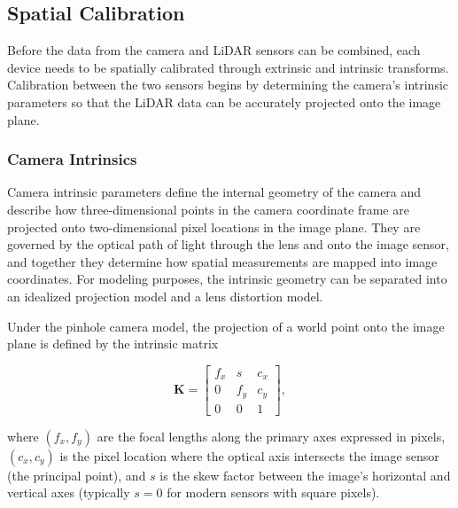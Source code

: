 \documentclass{erauthesis}
\begin{document}
\subsection{Spatial Calibration} \label{spatial_calibration}

Before the data from the camera and \ac{LiDAR} sensors can be combined, each device needs to be spatially calibrated through extrinsic and intrinsic transforms.
Calibration between the two sensors begins by determining the camera's intrinsic parameters so that the LiDAR data can be accurately projected onto the image plane.

\subsubsection{Camera Intrinsics} \label{camera_intrinsics}

Camera intrinsic parameters define the internal geometry of the camera and describe how three-dimensional points in the camera coordinate frame are projected onto two-dimensional pixel locations in the image plane.  
They are governed by the optical path of light through the lens and onto the image sensor, and together they determine how spatial measurements are mapped into image coordinates.  
For modeling purposes, the intrinsic geometry can be separated into an idealized projection model and a lens distortion model.

Under the pinhole camera model, the projection of a world point onto the image plane is defined by the intrinsic matrix %

\begin{equation}
    \mathbf{K} = 
    \begin{bmatrix}
        f_x & s & c_x \\
        0 & f_y & c_y \\
        0 & 0 & 1
    \end{bmatrix},
\end{equation}

where $(f_x, f_y)$ are the focal lengths along the primary axes expressed in pixels, $(c_x, c_y)$ is the pixel location where the optical axis intersects the image sensor (the principal point), and $s$ is the skew factor between the image’s horizontal and vertical axes (typically $s = 0$ for modern sensors with square pixels).
\end{document}
